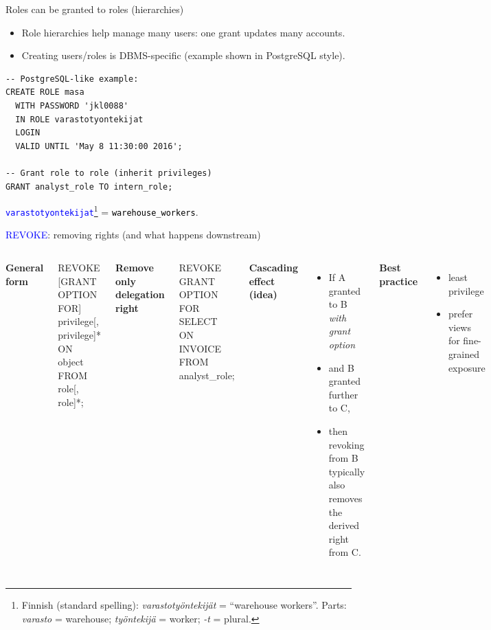 \documentclass[10pt,aspectratio=169]{beamer}
\newcommand{\fin}[1]{\textcolor{blue}{\texttt{#1}}}
\newcommand{\eng}[1]{\textcolor{black}{\texttt{#1}}}
\newcommand{\sqlk}[1]{\textcolor{blue}{#1}}
\begin{document}
\begin{frame}[fragile]{Roles can be granted to roles (hierarchies)}
\small
\begin{itemize}
  \item Role hierarchies help manage many users: one grant updates many accounts.
  \item Creating users/roles is DBMS-specific (example shown in PostgreSQL style).
\end{itemize}

\vspace{1mm}
\begin{lstlisting}[style=sqlite,basicstyle=\scriptsize\ttfamily]
-- PostgreSQL-like example:
CREATE ROLE masa
  WITH PASSWORD 'jkl0088'
  IN ROLE varastotyontekijat
  LOGIN
  VALID UNTIL 'May 8 11:30:00 2016';

-- Grant role to role (inherit privileges)
GRANT analyst_role TO intern_role;
\end{lstlisting}

\vspace{0.3em}
\footnotesize
\fin{varastotyontekijat}\footnote{Finnish (standard spelling): \emph{varastoty\"ontekij\"at} = “warehouse workers”.
Parts: \emph{varasto} = warehouse; \emph{ty\"ontekij\"a} = worker; \emph{-t} = plural.}
= \eng{warehouse\_workers}.

\end{frame}

\begin{frame}[fragile]{\sqlk{REVOKE}: removing rights (and what happens downstream)}
\small
\begin{columns}[T,onlytextwidth]
\textbf{General form}
\begin{codesql}
REVOKE [GRANT OPTION FOR] privilege[, privilege]*
ON object
FROM role[, role]*;
\end{codesql}

\textbf{Remove only delegation right}
\begin{codesql}
REVOKE GRANT OPTION FOR SELECT
ON INVOICE
FROM analyst_role;
\end{codesql}

\textbf{Cascading effect (idea)}
\begin{itemize}
  \item If A granted to B \emph{with grant option}
  \item and B granted further to C,
  \item then revoking from B typically also removes the derived right from C.
\end{itemize}

\vspace{1mm}
\textbf{Best practice}
\begin{itemize}
  \item least privilege
  \item prefer views for fine-grained exposure
\end{itemize}
\end{columns}
\end{frame}
\end{document}
